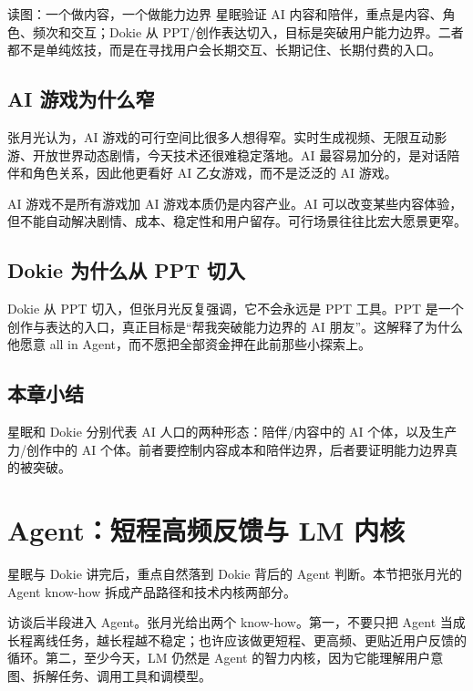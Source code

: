 \documentclass[a4paper]{article}
\begin{document}
\begin{knowledgebox}{读图：一个做内容，一个做能力边界}
星眠验证 AI 内容和陪伴，重点是内容、角色、频次和交互；Dokie 从 PPT/创作表达切入，目标是突破用户能力边界。二者都不是单纯炫技，而是在寻找用户会长期交互、长期记住、长期付费的入口。
\end{knowledgebox}

\subsection{AI 游戏为什么窄}

张月光认为，AI 游戏的可行空间比很多人想得窄。实时生成视频、无限互动影游、开放世界动态剧情，今天技术还很难稳定落地。AI 最容易加分的，是对话陪伴和角色关系，因此他更看好 AI 乙女游戏，而不是泛泛的 AI 游戏。

\begin{warningbox}{AI 游戏不是所有游戏加 AI}
游戏本质仍是内容产业。AI 可以改变某些内容体验，但不能自动解决剧情、成本、稳定性和用户留存。可行场景往往比宏大愿景更窄。
\end{warningbox}

\subsection{Dokie 为什么从 PPT 切入}

Dokie 从 PPT 切入，但张月光反复强调，它不会永远是 PPT 工具。PPT 是一个创作与表达的入口，真正目标是“帮我突破能力边界的 AI 朋友”。这解释了为什么他愿意 all in Agent，而不愿把全部资金押在此前那些小探索上。

\subsection{本章小结}

星眠和 Dokie 分别代表 AI 人口的两种形态：陪伴/内容中的 AI 个体，以及生产力/创作中的 AI 个体。前者要控制内容成本和陪伴边界，后者要证明能力边界真的被突破。

\section{Agent：短程高频反馈与 LM 内核}

星眠与 Dokie 讲完后，重点自然落到 Dokie 背后的 Agent 判断。本节把张月光的 Agent know-how 拆成产品路径和技术内核两部分。

访谈后半段进入 Agent。张月光给出两个 know-how。第一，不要只把 Agent 当成长程离线任务，越长程越不稳定；也许应该做更短程、更高频、更贴近用户反馈的循环。第二，至少今天，LM 仍然是 Agent 的智力内核，因为它能理解用户意图、拆解任务、调用工具和调模型。
\end{document}
